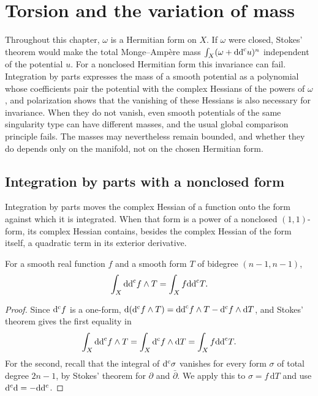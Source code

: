 \chapter{Torsion and the variation of mass}
\label{chap:mass}

Throughout this chapter, $\omega$ is a Hermitian form on $X$. If $\omega$ were closed, Stokes' theorem would make the total Monge--Amp\`ere mass $\int_X(\omega+\mathrm{dd}^{\mathrm{c}} u)^n$ independent of the potential $u$. For a nonclosed Hermitian form this invariance can fail. Integration by parts expresses the mass of a smooth potential as a polynomial whose coefficients pair the potential with the complex Hessians of the powers of $\omega$, and polarization shows that the vanishing of these Hessians is also necessary for invariance. When they do not vanish, even smooth potentials of the same singularity type can have different masses, and the usual global comparison principle fails. The masses may nevertheless remain bounded, and whether they do depends only on the manifold, not on the chosen Hermitian form.

\section{Integration by parts with a nonclosed form}

Integration by parts moves the complex Hessian of a function onto the form against which it is integrated. When that form is a power of a nonclosed $(1,1)$-form, its complex Hessian contains, besides the complex Hessian of the form itself, a quadratic term in its exterior derivative.

\begin{lemma}\label{lem:ibp}
For a smooth real function $f$ and a smooth form $T$ of bidegree $(n-1,n-1)$,
\[
 \int_X\mathrm{dd}^{\mathrm{c}} f\wedge T=\int_X f\mathrm{dd}^{\mathrm{c}} T.
\]
\end{lemma}
\begin{proof}
Since $\mathrm d^{\mathrm c} f$ is a one-form, $\mathrm{d}(\mathrm d^{\mathrm c} f\wedge T)=\mathrm{dd}^{\mathrm{c}} f\wedge T-\mathrm d^{\mathrm c} f\wedge\mathrm{d}T$, and Stokes' theorem gives the first equality in
\[
 \int_X\mathrm{dd}^{\mathrm{c}} f\wedge T
 =\int_X\mathrm d^{\mathrm c} f\wedge \mathrm{d}T
 =\int_X f\mathrm{dd}^{\mathrm{c}} T.
\]
For the second, recall that the integral of $\mathrm d^{\mathrm c}\sigma$ vanishes for every form $\sigma$ of total degree $2n-1$, by Stokes' theorem for $\partial$ and $\bar\partial$. We apply this to $\sigma=f\,\mathrm{d}T$ and use $\mathrm d^{\mathrm c}\mathrm{d}=-\mathrm{d}\mathrm d^{\mathrm c}$.
\end{proof}

